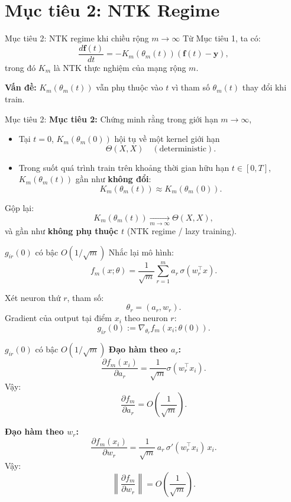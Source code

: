 \section{Mục tiêu 2: NTK Regime}
\begin{frame}{Mục tiêu 2: NTK regime khi chiều rộng $m \to \infty$}
  Từ Mục tiêu 1, ta có:
  \[
    \frac{d\mathbf f(t)}{dt}
    = -K_m(\theta_m(t))(\mathbf f(t) - \mathbf y),
  \]
  trong đó $K_m$ là NTK thực nghiệm của mạng rộng $m$.

  \vspace{0.2cm}
  \textbf{Vấn đề:} $K_m(\theta_m(t))$ vẫn phụ thuộc vào $t$
  vì tham số $\theta_m(t)$ thay đổi khi train.
\end{frame}

\begin{frame}{Mục tiêu 2:}
      \textbf{Mục tiêu 2:} Chứng minh rằng trong giới hạn $m \to \infty$,
  \begin{itemize}
    \item Tại $t=0$, $K_m(\theta_m(0))$ hội tụ về một kernel giới hạn
          \[
            \Theta(X,X) \quad (\text{deterministic}).
          \]
    \item Trong suốt quá trình train trên khoảng thời gian hữu hạn $t \in [0,T]$,
          $K_m(\theta_m(t))$ gần như \textbf{không đổi}:
          \[
            K_m(\theta_m(t)) \approx K_m(\theta_m(0)).
          \]
  \end{itemize}

  \vspace{0.2cm}
  Gộp lại:
  \[
    K_m(\theta_m(t))
    \xrightarrow[m\to\infty]{}
    \Theta(X,X),
  \]
  và gần như \textbf{không phụ thuộc $t$} (NTK regime / lazy training).
\end{frame}

\begin{frame}{$g_{ir}(0)$ có bậc $O(1/\sqrt{m})$}
  Nhắc lại mô hình:
  \[
    f_m(x;\theta)
    = \frac{1}{\sqrt{m}} \sum_{r=1}^m a_r\,\sigma(w_r^\top x).
  \]

  Xét neuron thứ $r$, tham số:
  \[
    \theta_r = (a_r, w_r).
  \]
  Gradient của output tại điểm $x_i$ theo neuron $r$:
  \[
    g_{ir}(0) := \nabla_{\theta_r} f_m(x_i; \theta(0)).
  \]
\end{frame}

\begin{frame}{$g_{ir}(0)$ có bậc $O(1/\sqrt{m})$}
      \textbf{Đạo hàm theo $a_r$:}
  \[
    \frac{\partial f_m(x_i)}{\partial a_r}
    = \frac{1}{\sqrt{m}} \sigma(w_r^\top x_i).
  \]
Vậy:
  \[
    \frac{\partial f_m}{\partial a_r}
    = O\!\left(\frac{1}{\sqrt{m}}\right).
  \]

  \vspace{0.2cm}
  \textbf{Đạo hàm theo $w_r$:}
  \[
    \frac{\partial f_m(x_i)}{\partial w_r}
    = \frac{1}{\sqrt{m}}\,a_r\,\sigma'(w_r^\top x_i)\, x_i.
  \]
Vậy:
  \[
    \left\|\frac{\partial f_m}{\partial w_r}\right\|
    = O\!\left(\frac{1}{\sqrt{m}}\right).
  \]
\end{frame}

